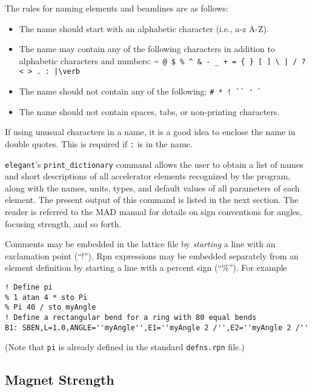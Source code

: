 \documentclass[11pt]{article}
\begin{document}
The rules for naming elements and beamlines are as follows:
\begin{itemize}
\item The name should start with an alphabetic character (i.e., a-z A-Z).
\item The name may contain any of the following characters in addition to
alphabetic characters and numbers: 
\verb#~ @ $ % ^ & - _ + = { } [ ] \ | / ? < > . : |\verb#
\item The name should not contain any of the following: \verb|# * ! `` ' `|
\item The name should not contain spaces, tabs, or non-printing characters.
\end{itemize}
If using unusual characters in a name, it is a good idea to enclose the name
in double quotes.   This is required if \verb|:| is in the name.

{\tt elegant}'s \verb|print_dictionary| command allows the user to
obtain a list of names and short descriptions of all accelerator
elements recognized by the program, along with the names, units,
types, and default values of all parameters of each element. 
The present output of this command is listed in the next section.
The reader is referred to the MAD manual\cite{MAD} for details on sign
conventions for angles, focusing strength, and so forth.  

Comments may be embedded in the lattice file by {\em starting} a line with 
an exclamation point (``!'').
Rpn expressions may be embedded separately
from an element definition by starting a line with a percent sign (``\%'').
For example
\begin{verbatim}
! Define pi
% 1 atan 4 * sto Pi
% Pi 40 / sto myAngle
! Define a rectangular bend for a ring with 80 equal bends
B1: SBEN,L=1.0,ANGLE=''myAngle'',E1=''myAngle 2 /'',E2=''myAngle 2 /''
\end{verbatim}
(Note that {\tt pi} is already defined in the standard {\tt defns.rpn} file.)

\subsection{Magnet Strength}
\end{document}
